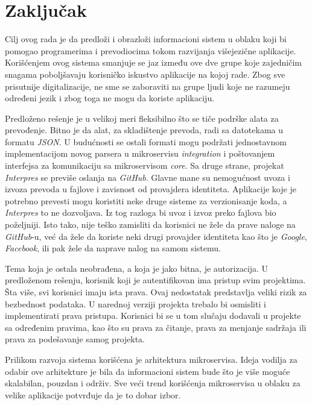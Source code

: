 \chapter{Zaključak}\label{ch:zakljucak}

Cilj ovog rada je da predloži i obrazloži informacioni sistem u oblaku koji bi pomogao 
programerima i prevodiocima tokom razvijanja višejezične aplikacije. Korišćenjem ovog 
sistema smanjuje se jaz između ove dve grupe koje zajedničim snagama poboljšavaju 
korisničko iskustvo aplikacije na kojoj rade. Zbog sve prisutnije digitalizacije, 
ne sme se zaboraviti na grupe ljudi koje ne razumeju određeni jezik i zbog toga 
ne mogu da koriste aplikaciju.

Predloženo rešenje je u velikoj meri fleksibilno što se tiče podrške alata za prevođenje.
Bitno je da alat, za skladištenje prevoda, radi sa datotekama u formatu \textit{JSON}. 
U budućnosti se ostali formati mogu podržati jednostavnom implementacijom novog parsera
u mikroservisu \textit{integration} i poštovanjem interfejsa za komunikaciju sa 
mikroservisom \textit{core}. Sa druge strane, projekat \textit{Interpres} se previše 
oslanja na \textit{GitHub}. Glavne mane su nemogućnost uvoza i izvoza prevoda u fajlove 
i zavisnost od provajdera identiteta. Aplikacije koje je potrebno prevesti mogu koristiti 
neke druge sisteme za verzionisanje koda, a \textit{Interpres} to ne dozvoljava. Iz tog 
razloga bi uvoz i izvoz preko fajlova bio poželjniji. Isto tako, 
nije teško zamisliti da korisnici ne žele da prave naloge na \textit{GitHub}-u, već da 
žele da koriste neki drugi provajder identiteta kao što je \textit{Google},
\textit{Facebook}, ili pak žele da naprave nalog na samom sistemu.

Tema koja je ostala neobrađena, a koja je jako bitna, je autorizacija. U predloženom rešenju,
korisnik koji je autentifikovan ima pristup svim projektima. Šta više, svi korisnici imaju ista prava. 
Ovaj nedostatak predstavlja veliki rizik za bezbednost podataka. U narednoj verziji projekta trebalo bi osmisliti i 
implementirati prava pristupa. Korisnici bi se u tom slučaju dodavali u projekte sa određenim 
pravima, kao što su prava za čitanje, prava za menjanje sadržaja ili prava za podešavanje 
samog projekta.

Prilikom razvoja sistema korišćena je arhitektura mikroservisa. Ideja vodilja za odabir 
ove arhitekture je bila da informacioni sistem bude što je više moguće skalabilan, 
pouzdan i održiv. Sve veći trend korišćenja mikroservisa u oblaku za velike aplikacije 
potvrđuje da je to dobar izbor. 

